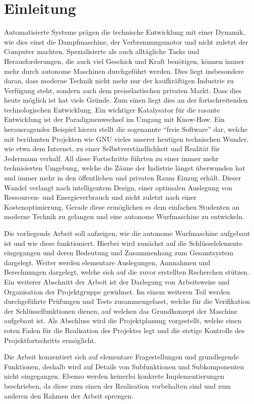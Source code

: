 \section{Einleitung}
Automatisierte Systeme prägen die technische Entwicklung mit einer Dynamik,
wie dies einst die Dampfmaschine, der Verbrennungsmotor und nicht zuletzt der
Computer machten. Spezialisierte als auch alltägliche Tasks und 
Herausforderungen, die auch viel Geschick und Kraft benötigen, können immer
mehr durch autonome Maschinen durchgeführt werden. Dies liegt insbesondere
daran, dass moderne Technik nicht mehr nur der kaufkräftigen Industrie zu
Verfügung steht, sondern auch dem preiselastischen privaten Markt. Dass dies
heute möglich ist hat viele Gründe. Zum einen liegt dies an der
fortschreitenden technologischen Entwicklung. Ein wichtiger Katalysator für
die rasante Entwicklung ist der Paradigmenwechsel im Umgang mit Know-How.
Ein herausragendes Beispiel hierzu stellt die sogenannte 
``freie Software'' dar, welche mit berühmten Projekten wie GNU vieles
unserer heutigen technischen Wunder, wie etwa dem Internet, zu einer
Selbstverständlichkeit und Realität für Jedermann verhalf.
All diese Fortschritte führten zu einer immer mehr technisierten
Umgebung, welche die Zäune der Indistrie längst überwunden hat und immer
mehr in den öffentlichen und privaten Raum Einzug erhält. Dieser Wandel
verlangt nach intelligentem Design, einer optimalen Auslegung von
Ressourcen- und Energieverbrauch und nicht zuletzt nach einer
Kostenoptimierung. Gerade diese ermöglichen es dem einfachen Studenten an
moderne Technik zu gelangen und eine autonome Wurfmaschine zu
entwickeln. 

Die vorliegende Arbeit soll aufzeigen, wie die autonome Wurfmaschine
aufgebaut ist und wie diese funktioniert. Hierbei wird zunächst auf die
Schlüsselelemente eingegangen und deren Bedeutung und Zusammenhang
zum Gesamtsystem dargelegt. Weiter werden elementare Auslegungen, Annnahmen
und Berechnungen dargelegt, welche sich auf die zuvor erstellten Recherchen
stützen. Ein weiterer Abschnitt der Arbeit ist der Darlegung von Arbeitsweise
und Organisation der Projektgruppe gewidmet. Im einem weiteren Teil werden
durchgeführte Prüfungen und Tests zusammengefasst, welche für die Verifikation
der Schlüsselfunktionen dienen, auf welchen das Grundkonzept der Maschine
aufgebaut ist. Als Abschluss wird die Projektplanung vorgestellt, welche
einen roten Faden für die Realisation des Projektes legt und die stetige
Kontrolle des Projektfortschritts ermöglicht.

Die Arbeit konzentiert sich auf elementare Fragestellungen und grundlegende
Funktionen, deshalb wird auf Details von Subfunktionen und Subkomponenten
nicht eingegangen. Ebenso werden keinerlei konkrete Implementierungen 
beschrieben, da diese zum einen der Realisation vorbehalten sind und zum
anderen den Rahmen der Arbeit sprengen.
